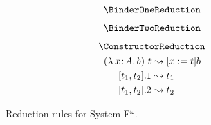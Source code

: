 
\begin{figure}
    \centering
    \begin{minipage}{0.5\textwidth}
        $$\BinderOneReduction$$
    \end{minipage}%
    \begin{minipage}{0.5\textwidth}
        $$\BinderTwoReduction$$
    \end{minipage}%
    $$\ConstructorReduction$$
    \begin{align*}
        ({\lambda}\, x\! : \! A.\, b)\ t &\leadsto [x := t]b \\
        [t_1, t_2].1 &\leadsto t_1 \\
        [t_1, t_2].2 &\leadsto t_2
    \end{align*}
    \caption{Reduction rules for System F$^\omega$.}
    \label{fig:reduction_fp}
\end{figure}


